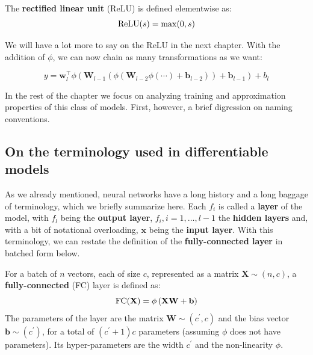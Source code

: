 \begin{definition} \addbottle
The \textbf{rectified linear unit} (ReLU) is defined elementwise as:
%
\begin{equation}
\textnormal{ReLU}(s)=\max(0,s)
\label{eq:relu}
\end{equation}
\end{definition}

We will have a lot more to say on the ReLU in the next chapter. With the addition of $\phi$, we can now chain as many transformations as we want:

\begin{equation}
y = \mathbf{w}_l^\top\phi\left( \mathbf{W}_{l-1}\left(\phi\left( \mathbf{W}_{l-2}\phi\left(\cdots\right)+\mathbf{b}_{l-2} \right)\right)+\mathbf{b}_{l-1} \right) + b_l
\label{eq:mlps_multiple_hidden_layer}
\end{equation}

In the rest of the chapter we focus on analyzing training and approximation properties of this class of models. First, however, a brief digression on naming conventions.

\subsection*{On the terminology used in differentiable models}

As we already mentioned, neural networks have a long history and a long baggage of terminology, which we briefly summarize here. Each $f_i$ is called a \textbf{layer} of the model, with $f_l$ being the \textbf{output layer}, $f_{i}, i=1,\ldots,l-1$ the \textbf{hidden layers} and, with a bit of notational overloading, $\mathbf{x}$ being the \textbf{input layer}. With this terminology, we can restate the definition of the \textbf{fully-connected layer} in batched form below.

\begin{definition} \addbottle
For a batch of $n$ vectors, each of size $c$, represented as a matrix $\mathbf{X} \sim (n,c)$, a \textbf{fully-connected} (FC) layer is defined as:
%
\begin{equation}
\textnormal{FC}(\mathbf{X}) = \phi\left(\mathbf{X}\mathbf{W} + \mathbf{b}\right)
\label{eq:fully_connected_layer}
\end{equation}
%
The parameters of the layer are the matrix $\mathbf{W} \sim (c^\prime,c)$ and the bias vector $\mathbf{b} \sim (c^\prime)$, for a total of $(c^\prime+1)c$ parameters (assuming $\phi$ does not have parameters). Its hyper-parameters are the width $c^\prime$ and the non-linearity $\phi$.
\end{definition}

